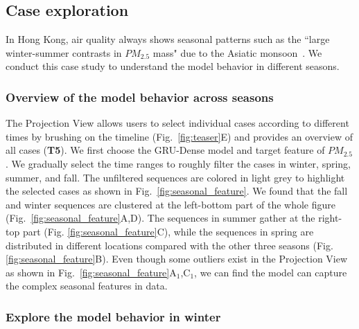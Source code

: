 \subsection{Case exploration}

In Hong Kong, air quality always shows seasonal patterns such as the ``large winter-summer contrasts in $PM_{2.5}$ mass" due to the Asiatic monsoon~\cite{louie2005seasonal}. We conduct this case study to understand the model behavior in different seasons.  

\subsubsection{Overview of the model behavior across seasons}

The Projection View allows users to select individual cases according to different times by brushing on the timeline (Fig.~\ref{fig:teaser}E) and provides an overview of all cases (\textbf{T5}).
We first choose the GRU-Dense model and target feature of $PM_{2.5}$.
We gradually select the time ranges to roughly filter the cases in winter, spring, summer, and fall. 
The unfiltered sequences are colored in light grey to highlight the selected cases as shown in  Fig.~\ref{fig:seasonal_feature}. 
We found that the fall and winter sequences are clustered at the left-bottom part of the whole figure (Fig.~\ref{fig:seasonal_feature}A,D). 
The sequences in summer gather at the right-top part (Fig. \ref{fig:seasonal_feature}C), while the sequences in spring are distributed in different locations compared with the other three seasons (Fig.\ref{fig:seasonal_feature}B).
Even though some outliers exist in the Projection View as shown in Fig.~\ref{fig:seasonal_feature}A$_1$,C$_1$, we can find the model can capture the complex seasonal features in data. 

\subsubsection{Explore the model behavior in winter}

